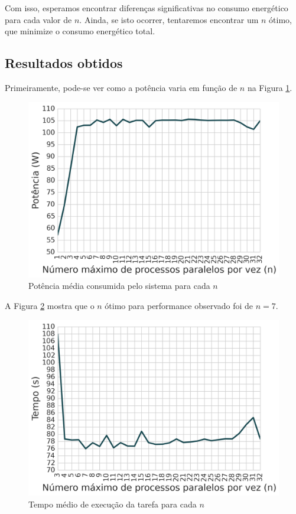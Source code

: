 Com isso, esperamos encontrar diferenças significativas no consumo energético para cada valor de $ n $. Ainda, se isto ocorrer, tentaremos encontrar um $ n $ ótimo, que minimize o consumo energético total.

\subsection{Resultados obtidos}
Primeiramente, pode-se ver como a potência varia em função de $ n $ na Figura \ref{fig:agendamento_meanpower}.

\begin{figure}[htp]
\centering
\includegraphics[scale=0.70]{figuras/Exper/AgendProc/meanpower.png}
\caption{Potência média consumida pelo sistema para cada $ n $ }
\label{fig:agendamento_meanpower}
\end{figure}

A Figura \ref{fig:agendamento_meantime} mostra que o $ n $ ótimo para performance observado foi de $ n = 7 $.

\begin{figure}[htp]
\centering
\includegraphics[scale=0.70]{figuras/Exper/AgendProc/meantime.png}
\caption{Tempo médio de execução da tarefa para cada $ n $ }
\label{fig:agendamento_meantime}
\end{figure}

